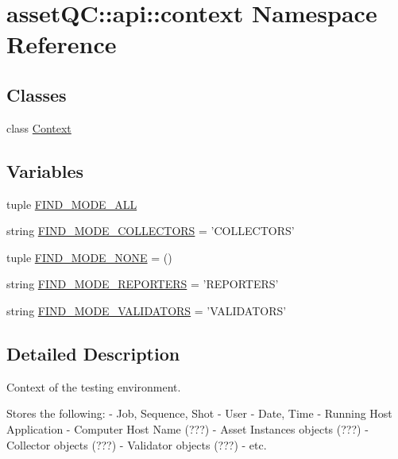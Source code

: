 \hypertarget{namespaceassetQC_1_1api_1_1context}{\section{asset\-Q\-C\-:\-:api\-:\-:context \-Namespace \-Reference}
\label{d4/d03/namespaceassetQC_1_1api_1_1context}
}
\subsection*{\-Classes}
\begin{DoxyCompactItemize}
\item 
class \hyperlink{classassetQC_1_1api_1_1context_1_1Context}{\-Context}
\end{DoxyCompactItemize}
\subsection*{\-Variables}
\begin{DoxyCompactItemize}
\item 
tuple \hyperlink{namespaceassetQC_1_1api_1_1context_adc7dd178258200aec1adff4e94aa1787}{\-F\-I\-N\-D\-\_\-\-M\-O\-D\-E\-\_\-\-A\-L\-L}
\item 
string \hyperlink{namespaceassetQC_1_1api_1_1context_a8d40afae80dfcbe56ec86a586ff7b429}{\-F\-I\-N\-D\-\_\-\-M\-O\-D\-E\-\_\-\-C\-O\-L\-L\-E\-C\-T\-O\-R\-S} = '\-C\-O\-L\-L\-E\-C\-T\-O\-R\-S'
\item 
tuple \hyperlink{namespaceassetQC_1_1api_1_1context_a85419516d986bb23ba4d1a5a845d80d0}{\-F\-I\-N\-D\-\_\-\-M\-O\-D\-E\-\_\-\-N\-O\-N\-E} = ()
\item 
string \hyperlink{namespaceassetQC_1_1api_1_1context_aa3d05d57d0a974f3a9a73ad0d51dea6c}{\-F\-I\-N\-D\-\_\-\-M\-O\-D\-E\-\_\-\-R\-E\-P\-O\-R\-T\-E\-R\-S} = '\-R\-E\-P\-O\-R\-T\-E\-R\-S'
\item 
string \hyperlink{namespaceassetQC_1_1api_1_1context_a79d6d33dccc00614cc7917e0b32efbac}{\-F\-I\-N\-D\-\_\-\-M\-O\-D\-E\-\_\-\-V\-A\-L\-I\-D\-A\-T\-O\-R\-S} = '\-V\-A\-L\-I\-D\-A\-T\-O\-R\-S'
\end{DoxyCompactItemize}


\subsection{\-Detailed \-Description}
\begin{DoxyVerb}
Context of the testing environment.

Stores the following:
- Job, Sequence, Shot
- User
- Date, Time
- Running Host Application
- Computer Host Name (???)
- Asset Instances objects (???)
- Collector objects (???)
- Validator objects (???)
- etc.
\end{DoxyVerb}
 

